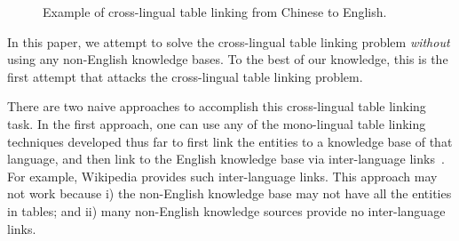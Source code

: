 
\begin{figure}[th]
\centering
{}
\caption{Example of cross-lingual table linking from Chinese to English.}
\label{fig:chinesetable}
\end{figure}

In this paper, we attempt to solve the cross-lingual table linking problem
{\em without} using any non-English knowledge bases.
To the best of our knowledge, this is the first attempt that attacks the 
cross-lingual table linking problem. 


There are two naive approaches to accomplish this cross-lingual table linking task.
In the first approach, one can use any of the mono-lingual table linking techniques developed thus far
to first link the entities to a knowledge base of that language, and then link to
the English knowledge base via inter-language links~\cite{tsai2016cross}.
For example, Wikipedia provides such inter-language links. 
This approach may not work because i) the non-English knowledge base 
may not have all the entities in tables; and ii)
many non-English knowledge sources provide no inter-language links. 


